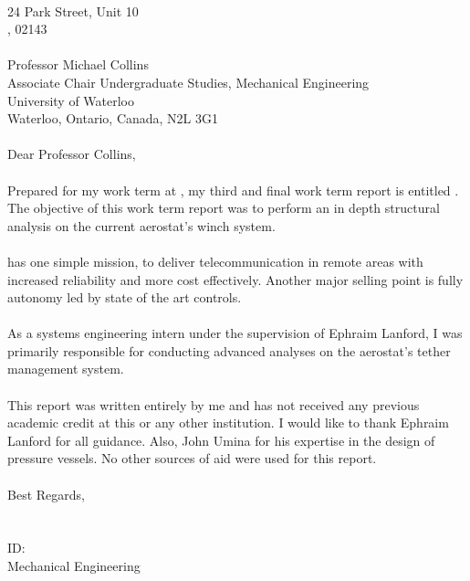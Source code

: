 \begin{declaration}

	\Company\\
	24 Park Street, Unit 10\\
	\CompanyCity , 02143\\
	\\ 
    Professor Michael Collins\\
	Associate Chair Undergraduate Studies, Mechanical Engineering\\
	University of Waterloo\\
	Waterloo, Ontario, Canada, N2L 3G1\\
	\\ 
    Dear Professor Collins,\\ 
    \\
    Prepared for my \Term work term at \textbf{\textsl{\Company}}, my third and final work term report is
	entitled \textbf{\textsl{\ReportTitle}}. The objective of this work term report was to perform an in depth structural analysis on the current aerostat's winch system.\\ 
	\\
	\Company  has one simple mission, to deliver telecommunication in remote areas with increased reliability and more cost effectively. Another major selling point is fully autonomy led by state of the art controls.\\
	\\
	As a systems engineering intern under the supervision of Ephraim Lanford, I was primarily responsible for conducting advanced analyses on the aerostat's tether management system.\\ 
	\\
	This report was written entirely by me and has not received any previous academic credit at this or
	any other institution. I would like to thank Ephraim Lanford for all guidance. Also, John Umina for his expertise in the design of pressure vessels. No other sources of aid were used for this report.\\ 
	\\
	Best Regards,\\
	\\
	\Seb\\
	ID: \\
	\Term Mechanical Engineering\\
	
	\thispagestyle{empty}
	
\end{declaration}


